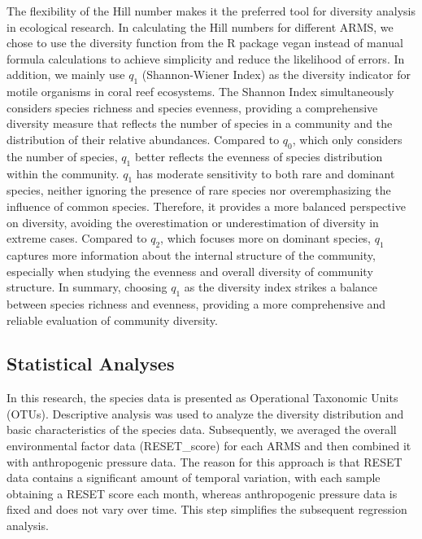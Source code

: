 \documentclass[a4paper, 11]{article}
\begin{document}
The flexibility of the Hill number makes it the preferred tool for diversity analysis in ecological research. In calculating the Hill numbers for different ARMS, we chose to use the diversity function from the R package vegan instead of manual formula calculations to achieve simplicity and reduce the likelihood of errors. In addition, we mainly use \(q_1\) (Shannon-Wiener Index) as the diversity indicator for motile organisms in coral reef ecosystems. The Shannon Index simultaneously considers species richness and species evenness, providing a comprehensive diversity measure that reflects the number of species in a community and the distribution of their relative abundances. Compared to \(q_0\), which only considers the number of species, \(q_1\) better reflects the evenness of species distribution within the community. \(q_1\) has moderate sensitivity to both rare and dominant species, neither ignoring the presence of rare species nor overemphasizing the influence of common species. Therefore, it provides a more balanced perspective on diversity, avoiding the overestimation or underestimation of diversity in extreme cases. Compared to \(q_2\), which focuses more on dominant species, \(q_1\) captures more information about the internal structure of the community, especially when studying the evenness and overall diversity of community structure. In summary, choosing \(q_1\) as the diversity index strikes a balance between species richness and evenness, providing a more comprehensive and reliable evaluation of community diversity.

\subsection{Statistical Analyses}

In this research, the species data is presented as Operational Taxonomic Units (OTUs). Descriptive analysis was used to analyze the diversity distribution and basic characteristics of the species data. Subsequently, we averaged the overall environmental factor data (RESET\_score) for each ARMS and then combined it with anthropogenic pressure data. The reason for this approach is that RESET data contains a significant amount of temporal variation, with each sample obtaining a RESET score each month, whereas anthropogenic pressure data is fixed and does not vary over time. This step simplifies the subsequent regression analysis. 
\end{document}
